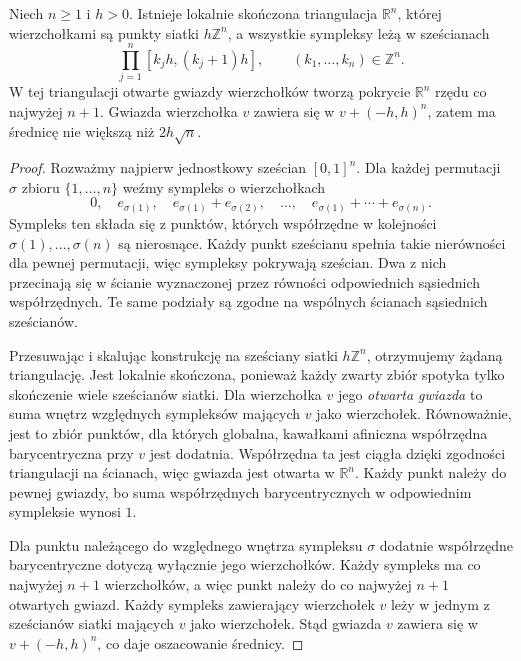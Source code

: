 \begin{lemat}
\label{lem:topog23-grid-triangulation}
Niech \(n\ge1\) i \(h>0\).
Istnieje lokalnie skończona triangulacja
\(\mathbb R^n\), której wierzchołkami
są punkty siatki \(h\mathbb Z^n\),
a wszystkie sympleksy leżą w sześcianach
\[
 \prod_{j=1}^{n}[k_jh,(k_j+1)h],
 \qquad (k_1,\ldots,k_n)\in\mathbb Z^n.
\]
W tej triangulacji otwarte gwiazdy wierzchołków
tworzą pokrycie \(\mathbb R^n\)
rzędu co najwyżej \(n+1\).
Gwiazda wierzchołka \(v\)
zawiera się w \(v+(-h,h)^n\),
zatem ma średnicę nie większą niż \(2h\sqrt n\).
\end{lemat}
\begin{proof}
Rozważmy najpierw jednostkowy sześcian
\([0,1]^n\).
Dla każdej permutacji \(\sigma\)
zbioru \(\{1,\ldots,n\}\)
weźmy sympleks o wierzchołkach
\[
 0,\quad e_{\sigma(1)},\quad
 e_{\sigma(1)}+e_{\sigma(2)},\quad\ldots,\quad
 e_{\sigma(1)}+\cdots+e_{\sigma(n)}.
\]
Sympleks ten składa się z punktów,
których współrzędne w kolejności
\(\sigma(1),\ldots,\sigma(n)\)
są nierosnące.
Każdy punkt sześcianu spełnia
takie nierówności dla pewnej permutacji,
więc sympleksy pokrywają sześcian.
Dwa z nich przecinają się w ścianie
wyznaczonej przez równości
odpowiednich sąsiednich współrzędnych.
Te same podziały są zgodne na wspólnych
ścianach sąsiednich sześcianów.

Przesuwając i skalując konstrukcję
na sześciany siatki \(h\mathbb Z^n\),
otrzymujemy żądaną triangulację.
Jest lokalnie skończona, ponieważ
każdy zwarty zbiór spotyka tylko
skończenie wiele sześcianów siatki.
Dla wierzchołka \(v\)
jego \emph{otwarta gwiazda}
to suma wnętrz względnych sympleksów
mających \(v\) jako wierzchołek.
Równoważnie, jest to zbiór punktów,
dla których globalna, kawałkami afiniczna
współrzędna barycentryczna przy \(v\)
jest dodatnia. Współrzędna ta jest ciągła
dzięki zgodności triangulacji na ścianach,
więc gwiazda jest otwarta w \(\mathbb R^n\).
Każdy punkt należy do pewnej gwiazdy,
bo suma współrzędnych barycentrycznych
w odpowiednim sympleksie wynosi \(1\).

Dla punktu należącego do względnego wnętrza
sympleksu \(\sigma\)
dodatnie współrzędne barycentryczne
dotyczą wyłącznie jego wierzchołków.
Każdy sympleks ma co najwyżej \(n+1\)
wierzchołków, a więc punkt należy
do co najwyżej \(n+1\) otwartych gwiazd.
Każdy sympleks zawierający wierzchołek \(v\)
leży w jednym z sześcianów siatki
mających \(v\) jako wierzchołek.
Stąd gwiazda \(v\) zawiera się w
\(v+(-h,h)^n\), co daje oszacowanie średnicy.
\end{proof}

